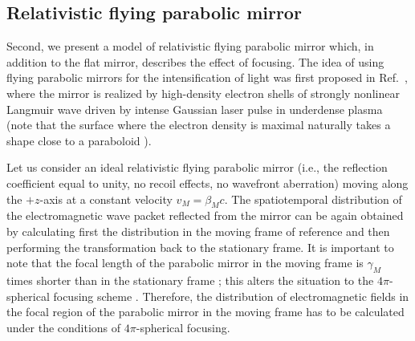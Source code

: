 \documentclass[10pt, a4paper, twoside, openright]{report}
\begin{document}
\subsection{Relativistic flying parabolic mirror\label{sec:rfpm}}


Second, we present a model of relativistic flying parabolic mirror which, in addition to the flat mirror, describes the effect of focusing. The idea of using flying parabolic mirrors for the intensification of light was first proposed in Ref.~, where the mirror is realized by high-density electron shells of strongly nonlinear Langmuir wave driven by intense Gaussian laser pulse in underdense plasma (note that the surface where the electron density is maximal naturally takes a shape close to a paraboloid \cite{Bulanov1991, Bulanov1995, Matlis2006, Shadwick2002, Maksimchuk2008}).

Let us consider an ideal relativistic flying parabolic mirror (i.e., the reflection coefficient equal to unity, no recoil effects, no wavefront aberration) moving along the $ +z $-axis at a constant velocity $ v_M = \beta_M c $. The spatiotemporal distribution of the electromagnetic wave packet reflected from the mirror can be again obtained by calculating first the distribution in the moving frame of reference and then performing the transformation back to the stationary frame. It is important to note that the focal length of the parabolic mirror in the moving frame is $ \gamma_M $ times shorter than in the stationary frame \cite{Bulanov2011, Jeong2021}; this alters the situation to the $ 4 \pi $-spherical focusing scheme \cite{Gonoskov2012, Jeong2020}. Therefore, the distribution of electromagnetic fields in the focal region of the parabolic mirror in the moving frame has to be calculated under the conditions of $ 4 \pi $-spherical focusing.
\end{document}
